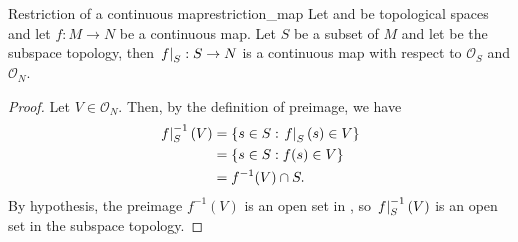 \begin{proposition}{Restriction of a continuous map}{restriction_map}
    Let  and  be topological spaces and let \(f : M \to N\) be a continuous map. Let \(S\) be a subset of \(M\) and let  be the subspace topology, then \(\left.f\right\rvert_{S} : S \to N\) is a continuous map with respect to \(\mathcal{O}_S\) and \(\mathcal{O}_N\).
\end{proposition}
\begin{proof}
    Let \(V \in \mathcal{O}_N\). Then, by the definition of preimage, we have
    \begin{align*}
        \left.f\right\rvert_{S}^{-1}(V) &= \{s \in S : \left.f\right\rvert_{S}(s) \in V\}\\
                                &= \{s \in S : f(s) \in V\}\\
                                &= f^{-1}(V) \cap S.
    \end{align*}
    By hypothesis, the preimage \(f^{-1}(V)\) is an open set in , so \(\left.f\right\rvert_{S}^{-1}(V)\) is an open set in the subspace topology.
\end{proof}

